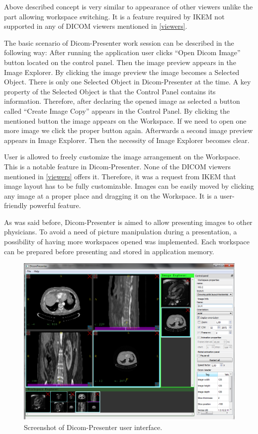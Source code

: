 Above described concept is very similar to appearance of other viewers unlike the part allowing workspace switching. It is a feature required by IKEM not supported in any of DICOM viewers mentioned in \ref{viewers}.

The basic scenario of Dicom-Presenter work session can be described in the following way: After running the application user clicks ``Open Dicom Image'' button located on the control panel. Then the image preview appears in the Image Explorer. By clicking the image preview the image becomes a Selected Object. There is only one Selected Object in Dicom-Presenter at the time. A key property of the Selected Object is that the Control Panel contains its information. Therefore, after declaring the opened image as selected a button called ``Create Image Copy'' appears in the Control Panel. By clicking the mentioned button the image appears on the Workspace. If we need to open one more image we click the proper button again. Afterwards a second image preview appears in Image Explorer. Then the necessity of Image Explorer becomes clear.

User is allowed to freely customize the image arrangement on the Workspace. This is a notable feature in Dicom-Presenter. None of the DICOM viewers mentioned in \ref{viewers} offers it. Therefore, it was a request from IKEM that image layout has to be fully customizable. Images can be easily moved  by clicking any image at a proper place and dragging it on the Workspace.  It is a user-friendly powerful feature.

As was said before, Dicom-Presenter is aimed to allow presenting images to other physicians. To avoid a need of picture manipulation during a presentation, a possibility of having more workspaces opened was implemented. Each workspace can be prepared before presenting and stored in application memory.
 
\begin{figure}
	\begin{center}
	\includegraphics[width=130mm]{Text/IMG/04_GUI_Screenshot.png}
	\end{center}
	\caption{Screenshot of Dicom-Presenter user interface.}
	\label{screenshot}
\end{figure}
